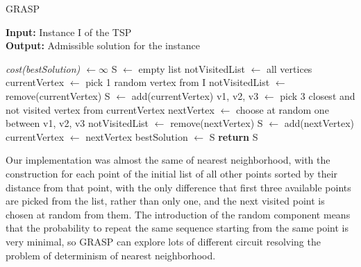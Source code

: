 \begin{algorithm}
	\caption{GRASP}\label{GRASP method}
	\hspace*{\algorithmicindent} \textbf{Input:} Instance I of the TSP \\
	\hspace*{\algorithmicindent} \textbf{Output:} Admissible solution for the instance
    \begin{algorithmic}[1]
    		\State \textit{cost(bestSolution) $\leftarrow \infty$}
			\State S $\leftarrow$ empty list
			\State notVisitedList $\leftarrow$ all vertices
			\State currentVertex $\leftarrow$ pick 1 random vertex from I
			\State notVisitedList $\leftarrow$ remove(currentVertex) 
			\State S $\leftarrow$ add(currentVertex)
				\State v1, v2, v3 $\leftarrow$ pick 3 closest and not visited vertex from currentVertex
				\State nextVertex $\leftarrow$ choose at random one between v1, v2, v3
				\State notVisitedList $\leftarrow$ remove(nextVertex) 
				\State S $\leftarrow$ add(nextVertex)
				\State currentVertex $\leftarrow$ nextVertex
			\EndFor
				\State bestSolution $\leftarrow$ S
			\EndIf
		\EndWhile 
		\State \textbf{return} S
    \end{algorithmic}
\end{algorithm}

\noindent Our implementation was almost the same of nearest neighborhood, with the construction for each point of the initial list of all other points sorted by their distance from that point, with the only difference that first three available points are picked from the list, rather than only one, and the next visited point is chosen at random from them. 
The introduction of the random component means that the probability to repeat the same sequence starting from the same point is very minimal, so GRASP can explore lots of different circuit resolving the problem of determinism of nearest neighborhood. 

